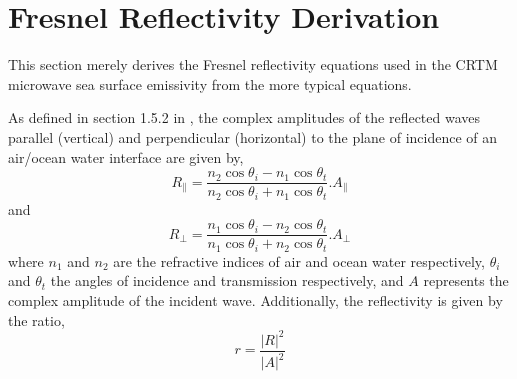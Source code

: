 \section{Fresnel Reflectivity Derivation}
\label{sec:fresnel_equations}
This section merely derives the Fresnel reflectivity equations used in the CRTM microwave sea surface emissivity from the more typical equations.

As defined in section 1.5.2 in \citet{BornWolf_1999}, the complex amplitudes of the reflected waves parallel (vertical) and perpendicular (horizontal) to the plane of incidence of an air/ocean water interface are given by,
\begin{equation}
  R_{\parallel} = \frac{n_{2}\cos\theta_{i} - n_{1}\cos\theta_{t}}{n_{2}\cos\theta_{i} + n_{1}\cos\theta_{t}}.A_{\parallel}
  \label{eqn:Rv_amplitude}
\end{equation}
and
\begin{equation}
  R_{\perp} = \frac{n_{1}\cos\theta_{i} - n_{2}\cos\theta_{t}}{n_{1}\cos\theta_{i} + n_{2}\cos\theta_{t}}.A_{\perp}
  \label{eqn:Rh_amplitude}
\end{equation}
where $n_{1}$ and $n_{2}$ are the refractive indices of air and ocean water respectively, $\theta_{i}$ and $\theta_{t}$ the angles of incidence and transmission respectively, and $A$ represents the complex amplitude of the incident wave. Additionally, the reflectivity is given by the ratio,
\begin{equation}
  r = \frac{|R|^{2}}{|A|^{2}}
  \label{eqn:reflectivity}
\end{equation}

